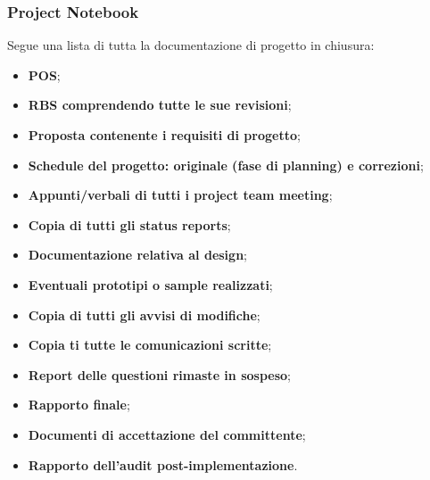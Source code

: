 \subsubsection{Project Notebook}
Segue una lista di tutta la documentazione di progetto in chiusura:
\begin{itemize}
	\item \textbf{POS};
	\item \textbf{RBS comprendendo tutte le sue revisioni};
	\item \textbf{Proposta contenente i requisiti di progetto};
	\item \textbf{Schedule del progetto: originale (fase di planning) e correzioni};
	\item \textbf{Appunti/verbali di tutti i project team meeting};
	\item \textbf{Copia di tutti gli status reports};
	\item \textbf{Documentazione relativa al design};
	\item \textbf{Eventuali prototipi o sample realizzati};
	\item \textbf{Copia di tutti gli avvisi di modifiche};
	\item \textbf{Copia ti tutte le comunicazioni scritte};
	\item \textbf{Report delle questioni rimaste in sospeso};
	\item \textbf{Rapporto finale};
	\item \textbf{Documenti di accettazione del committente};
	\item \textbf{Rapporto dell’audit post-implementazione}.
\end{itemize}
